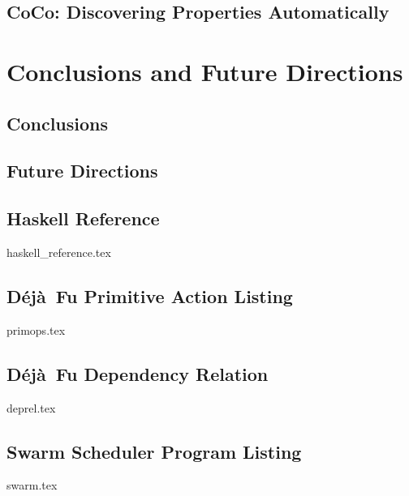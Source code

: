 \documentclass[openright,imperial,11pt]{octavo}
\newcommand{\dejafu}{D\'{e}j\`{a}~Fu}
\begin{document}
\chapter{CoCo: Discovering Properties Automatically}
\label{chp:coco}


\part{Conclusions and Future Directions}
\label{part:end}

\chapter{Conclusions}
\label{chp:conclusions}


\chapter{Future Directions}
\label{chp:future_work}


\begin{appendices}
\chapter{Haskell Reference}
\label{app:haskell}
{haskell_reference.tex}

\chapter{\dejafu{} Primitive Action Listing}
\label{app:primops}
{primops.tex}

\chapter{\dejafu{} Dependency Relation}
\label{app:deprel}
{deprel.tex}

\chapter{Swarm Scheduler Program Listing}
\label{app:swarm}
{swarm.tex}
\end{appendices}

\printbibliography[heading=bibintoc]
\end{document}
